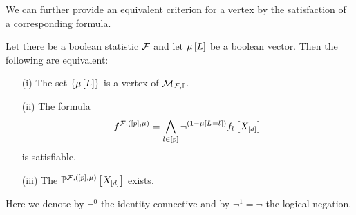 We can further provide an equivalent criterion for a vertex by the satisfaction of a corresponding formula.

\begin{theorem}
    Let there be a boolean statistic $\mathcal{F}$ and let $\mu\left[L\right]$ be a boolean vector.
    Then the following are equivalent:
    \begin{itemize}
        \item[(i)] The set $\{\mu\left[L\right]\}$ is a vertex of $\mathcal{M}_{\mathcal{F},\mathbb{I}}$.
        \item[(ii)] The formula
        \begin{align*}
            f^{\mathcal{F},([p],\mu)} = \bigwedge_{l\in[p]} \lnot^{(1-\mu\left[L_{}=l_{}\right])} f_{l}\left[X_{[d]}\right]
        \end{align*}
        is satisfiable.
        \item[(iii)] The \HardLogicNetwork{} $\mathbb{P}^{\mathcal{F},([p],\mu)}\left[X_{[d]}\right]$ exists. %
    \end{itemize}
    Here we denote by $\lnot^0$ the identity connective and by $\lnot^1=\lnot$ the logical negation.
\end{theorem}
